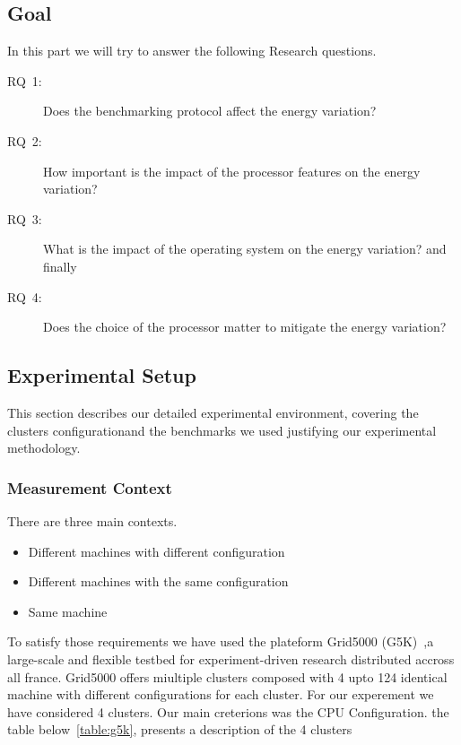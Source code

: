 





\subsection{Goal}
In this part we will try to answer the following Research questions.

\begin{description}
    \item[\textsc{RQ}~1:] Does the benchmarking protocol affect the energy variation?
    \item[\textsc{RQ}~2:] How important is the impact of the processor features on the energy variation?
    \item[\textsc{RQ}~3:] What is the impact of the operating system on the energy variation? and finally
    \item[\textsc{RQ}~4:] Does the choice of the processor matter to mitigate the energy variation?
\end{description}


\subsection{Experimental Setup}\label{subsec:setup}
This section describes our detailed experimental environment, covering the clusters configurationand the benchmarks we used  justifying our experimental methodology.

\subsubsection{Measurement Context}
There are three main contexts.
\begin{itemize}
    \item Different machines with different configuration
    \item Different machines with the same configuration
    \item Same machine
\end{itemize}

To satisfy those requirements we have used the plateform Grid5000 (G5K)~\cite{grid5000,margery:hal-00965708},a large-scale and flexible testbed for experiment-driven research distributed accross all france.
Grid5000 offers  miultiple clusters composed with 4 upto 124 identical machine with different configurations for each cluster.
For our experement we have considered 4 clusters. Our main creterions was the CPU Configuration.
the table below~\ref{table:g5k}, presents a description of the 4 clusters


